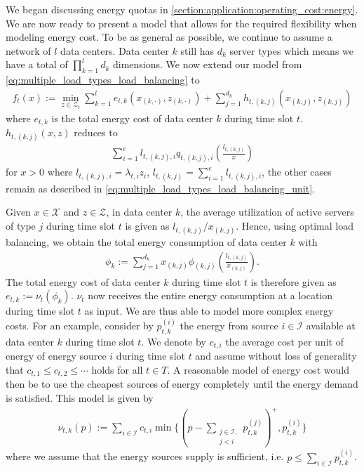We began discussing energy quotas in \autoref{section:application:operating_cost:energy}. We are now ready to present a model that allows for the required flexibility when modeling energy cost. To be as general as possible, we continue to assume a network of $l$ data centers. Data center $k$ still has $d_k$ server types which means we have a total of $\prod_{k=1}^l d_k$ dimensions. We now extend our model from \autoref{eq:multiple_load_types_load_balancing} to \begin{align*}
    f_t(x) := \min_{z \in \mathcal{Z}_t} \sum_{k=1}^l e_{t,k}(x_{(k,\cdot)},z_{(k,\cdot)}) + \sum_{j=1}^{d_k} h_{t,(k,j)}(x_{(k,j)},z_{(k,j)})
\end{align*} where $e_{t,k}$ is the total energy cost of data center $k$ during time slot $t$. $h_{t,(k,j)}(x,z)$ reduces to \begin{align*}
    \sum_{i=1}^e l_{t,(k,j),i} q_{t,(k,j),i}\left(\frac{l_{t,(k,j)}}{x}\right)
\end{align*} for $x > 0$ where $l_{t,(k,j),i} = \lambda_{t,i} z_i$, $l_{t,(k,j)} = \sum_{i=1}^e l_{t,(k,j),i}$, the other cases remain as described in \autoref{eq:multiple_load_types_load_balancing_unit}.

Given $x \in \mathcal{X}$ and $z \in \mathcal{Z}$, in data center $k$, the average utilization of active servers of type $j$ during time slot $t$ is given as $l_{t,(k,j)} / x_{(k,j)}$. Hence, using optimal load balancing, we obtain the total energy consumption of data center $k$ with \begin{align*}
    \phi_k := \sum_{j=1}^{d_k} x_{(k,j)} \phi_{(k,j)}\left(\frac{l_{t,(k,j)}}{x_{(k,j)}}\right).
\end{align*} The total energy cost of data center $k$ during time slot $t$ is therefore given as $e_{t,k} := \nu_t(\phi_k)$. $\nu_t$ now receives the entire energy consumption at a location during time slot $t$ as input. We are thus able to model more complex energy costs. For an example, consider by $p_{t,k}^{(i)}$ the energy from source $i \in \mathcal{I}$ available at data center $k$ during time slot $t$. We denote by $c_{t,i}$ the average cost per unit of energy of energy source $i$ during time slot $t$ and assume without loss of generality that $c_{t,1} \leq c_{t,2} \leq \cdots$ holds for all $t \in T$. A reasonable model of energy cost would then be to use the cheapest sources of energy completely until the energy demand is satisfied. This model is given by \begin{align*}
    \nu_{t,k}(p) := \sum_{i \in \mathcal{I}} c_{t,i} \min\{(p - \sum_{\substack{j \in \mathcal{I}, \\ j < i}} p_{t,k}^{(j)})^+, p_{t,k}^{(i)}\}
\end{align*} where we assume that the energy sources supply is sufficient, i.e. $p \leq \sum_{i \in \mathcal{I}} p_{t,k}^{(i)}$.

